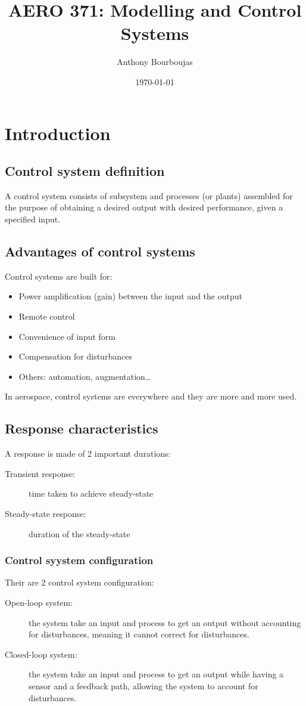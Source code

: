\documentclass[10pt, twocolumn]{article}
\title{AERO 371: Modelling and Control Systems}
\date{\today}
\author{Anthony Bourboujas}
\begin{document}
\maketitle %
\section{Introduction}
\subsection{Control system definition}
A control system consists of subsystem and processes (or plants) assembled for the purpose of obtaining a desired output with desired performance, given a specified input.


\subsection{Advantages of control systems}
Control systems are built for:
\begin{itemize}
  \item Power amplification (gain) between the input and the output
  \item Remote control
  \item Convenience of input form
  \item Compensation for disturbances
  \item Others: automation, augmentation\dots{}
\end{itemize}

In aerospace, control systems are everywhere and they are more and more used.


\subsection{Response characteristics}
A response is made of 2 important durations:
\begin{description}
  \item[Transient response:] time taken to achieve steady-state
  \item[Steady-state response:] duration of the steady-state
\end{description}


\subsubsection{Control syystem configuration}
Their are 2 control system configuration:
\begin{description}
  \item[Open-loop system:] the system take an input and process to get an output without accounting for disturbances, meaning it cannot correct for disturbances.
  \item[Closed-loop system:] the system take an input and process to get an output while having a sensor and a feedback path, allowing the system to account for disturbances.
\end{description}
\end{document}
